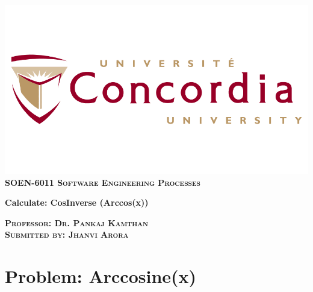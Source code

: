 \documentclass[a4paper,12pt]{article}
\newcommand{\Name}{Jhanvi Arora}
\newcommand{\ProjectName}{Calculate: CosInverse (Arccos(x))}
\newcommand{\Course}{\textbf{SOEN-6011 \vspace{0.5cm} Software Engineering Processes}}
\newcommand{\ProfessorName}{Dr. Pankaj Kamthan}
\begin{document}

\begin{titlepage}
\newcommand{\HRule}{\rule{\linewidth}{0.2mm}} %


\centering
\includegraphics[scale=.35]{concordia.png}\\[1cm]
\textsc{\Large \Course} \\ [0.5cm]


{ {\huge{\textbf{\ProjectName}}} 



\vspace{8cm}
\Large \textsc{\textbf{Professor: \ProfessorName}}\\
\Large \textsc{\textbf{Submitted by: \Name}}\\
\vfill
}
\end{titlepage}





\pagebreak


\section{Problem: Arccosine(x)}
\end{document}
